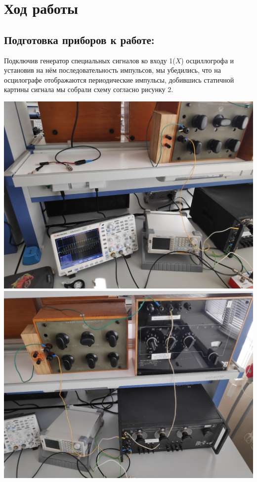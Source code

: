 \documentclass[a4paper,12pt]{article}
\begin{document}
	\section{Ход работы}
 \subsection{Подготовка приборов к работе:}
 Подключив генератор специальных сигналов ко входу 1($X$) осциллогрофа и установив на нём последовательность импульсов, мы убедились, что на осцилографе отображаются периодические импульсы, добившись статичной картины сигнала мы собрали схему согласно рисунку 2. 

\includegraphics[width=0.48\linewidth]{Photo1.jpg}
\includegraphics[width=0.48\linewidth]{Photo 2.jpg}

\newpage
\end{document}
